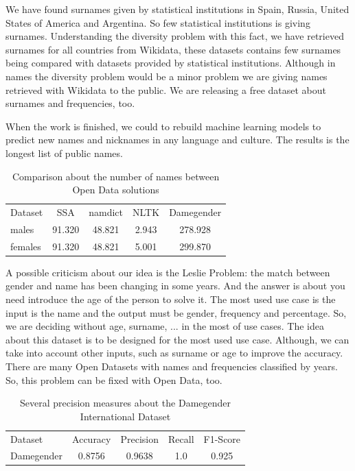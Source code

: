 \documentclass[a4paper]{article}
\begin{document}
We have found surnames given by statistical institutions in Spain,
Russia, United States of America and Argentina. So few statistical
institutions is giving surnames. Understanding the diversity problem
with this fact, we have retrieved surnames for all countries from
Wikidata, these datasets contains few surnames being compared with
datasets provided by statistical institutions. Although in names the
diversity problem would be a minor problem we are giving names
retrieved with Wikidata to the public. We are releasing a free dataset
about surnames and frequencies, too.

When the work is finished, we could to rebuild machine learning models
to predict new names and nicknames in any language and culture. The
results is the longest list of public names.

\begin{table}[t]
\footnotesize
\begin{tabular}[]{lcccc}
  \hline
  Dataset & SSA & namdict & NLTK & Damegender \tabularnewline
  males & 91.320 & 48.821 & 2.943 & 278.928 \tabularnewline
  females & 91.320 & 48.821 & 5.001 & 299.870 \tabularnewline
  \hline
\end{tabular}
\caption{Comparison about the number of names between Open Data solutions}
\label{table:DifferentNamesMeasures}
\end{table}

A possible criticism about our idea is the Leslie
Problem\cite{blevins2015jane}: the match between gender and name has
been changing in some years. And the answer is about you need
introduce the age of the person to solve it. The most used use case is
the input is the name and the output must be gender, frequency and
percentage. So, we are deciding without age, surname, ... in the most
of use cases. The idea about this dataset is to be designed for the
most used use case. Although, we can take into account other inputs,
such as surname or age to improve the accuracy. There are many Open
Datasets with names and frequencies classified by years. So, this
problem can be fixed with Open Data, too.

\begin{table}[t]
\footnotesize
\begin{tabular}[]{lcccc}
  \hline
  Dataset  & Accuracy & Precision & Recall & F1-Score  \tabularnewline
  Damegender &  0.8756  & 0.9638    & 1.0    & 0.925  \tabularnewline
  \hline
\end{tabular}
\caption{Several precision measures about the Damegender International Dataset}
\label{table:DifferentAccuracyMeasures}
\end{table}
\end{document}
